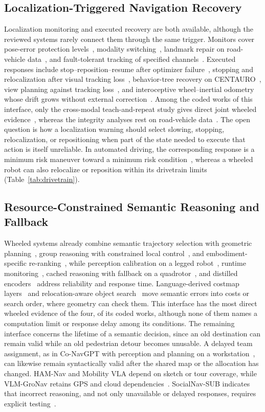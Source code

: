 \subsection{Localization-Triggered Navigation Recovery}
Localization monitoring and executed recovery are both available, although the reviewed systems rarely connect them through the same trigger. Monitors cover pose-error protection levels~\cite{P_F01}, modality switching~\cite{P_F04}, landmark repair on road-vehicle data~\cite{P_F03}, and fault-tolerant tracking of specified channels~\cite{P_F02}. Executed responses include stop--reposition--resume after optimizer failure~\cite{P_E59}, stopping and relocalization after visual tracking loss~\cite{P_N10}, behavior-tree recovery on CENTAURO~\cite{P_N17}, view planning against tracking loss~\cite{P_R33}, and interoceptive wheel--inertial odometry whose drift grows without external correction~\cite{P_R04}. Among the \IfaceOneWorks{} coded works of this interface, only the cross-modal teach-and-repeat study gives direct joint wheeled evidence~\cite{P_R11}, whereas the integrity analyses rest on road-vehicle data~\cite{P_X07,P_M28}. The open question is how a localization warning should select slowing, stopping, relocalization, or repositioning when part of the state needed to execute that action is itself unreliable. In automated driving, the corresponding response is a minimum risk maneuver toward a minimum risk condition~\cite{B_MRMFallback2025}, whereas a wheeled robot can also relocalize or reposition within its drivetrain limits (Table~\ref{tab:drivetrain}).

\subsection{Resource-Constrained Semantic Reasoning and Fallback}
Wheeled systems already combine semantic trajectory selection with geometric planning~\cite{P_F05,P_R25}, group reasoning with constrained local control~\cite{P_F06}, and embodiment-specific re-ranking~\cite{P_R26}, while perception calibration on a legged robot~\cite{P_F08}, runtime monitoring~\cite{P_F07}, cached reasoning with fallback on a quadrotor~\cite{P_E60}, and distilled encoders~\cite{P_R29} address reliability and response time. Language-derived costmap layers~\cite{P_R30} and relocation-aware object search~\cite{P_R27} move semantic errors into costs or search order, where geometry can check them. This interface has the most direct wheeled evidence of the four, \IfaceTwoDirect{} of its \IfaceTwoWorks{} coded works, although none of them names a computation limit or response delay among its conditions. The remaining interface concerns the lifetime of a semantic decision, since an old destination can remain valid while an old pedestrian detour becomes unusable. A delayed team assignment, as in Co-NavGPT with perception and planning on a workstation~\cite{P_N09}, can likewise remain syntactically valid after the shared map or the allocation has changed. HAM-Nav and Mobility VLA depend on sketch or tour coverage, while VLM-GroNav retains GPS and cloud dependencies~\cite{P_S39,P_S43,P_S40}. SocialNav-SUB indicates that incorrect reasoning, and not only unavailable or delayed responses, requires explicit testing~\cite{P_S44}.

